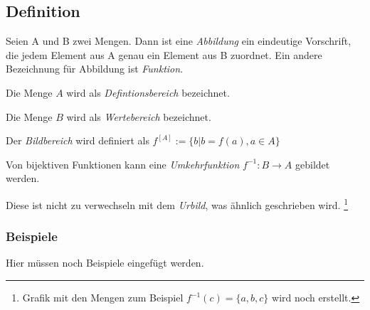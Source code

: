 \subsection{Definition}
Seien A und B zwei Mengen.
Dann ist eine \emph{Abbildung} ein eindeutige Vorschrift, die jedem Element aus A genau ein Element aus B zuordnet.
Ein andere Bezeichnung für Abbildung ist \emph{Funktion}.

Die Menge $A$ wird als \emph{Defintionsbereich} bezeichnet.

Die Menge $B$ wird als \emph{Wertebereich} bezeichnet.

Der \emph{Bildbereich} wird definiert als $ f^{ [A] }:=\{b | b=f(a) , a \in A \}$

Von bijektiven Funktionen kann eine \emph{Umkehrfunktion} $f^{-1} : {B}\rightarrow{A} $ gebildet werden.

Diese ist nicht zu verwechseln mit dem \emph{Urbild}, was ähnlich geschrieben wird.
\footnote{Grafik mit den Mengen zum Beispiel $ f^{-1}(c) = \{a,b,c\} $  wird noch erstellt.}

\subsubsection*{Beispiele}
Hier müssen noch Beispiele eingefügt werden.